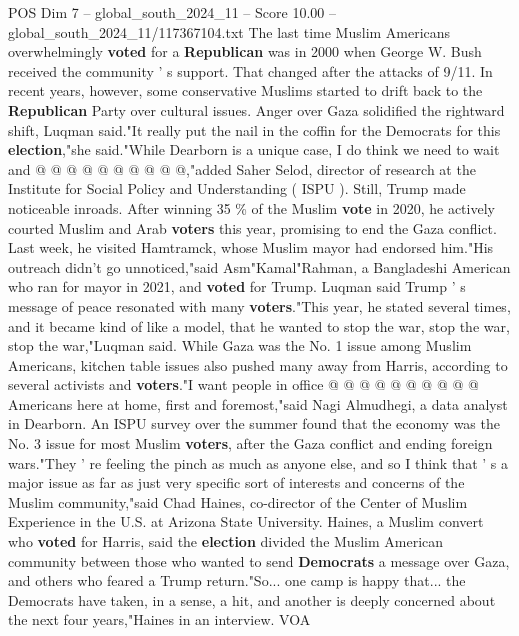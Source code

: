 \begin{textsample}{POS Dim 7 – global\_south\_2024\_11 – Score 10.00 – global\_south\_2024\_11/117367104.txt}
The last time Muslim Americans overwhelmingly \textbf{voted} for a \textbf{Republican} was in 2000 when George W.
Bush received the community ' s support.
That changed after the attacks of 9/11.
In recent years, however, some conservative Muslims started to drift back to the \textbf{Republican} Party over cultural issues.
Anger over Gaza solidified the rightward shift, Luqman said."It really put the nail in the coffin for the Democrats for this \textbf{election},"she said."While Dearborn is a unique case, I do think we need to wait and @ @ @ @ @ @ @ @ @ @,"added Saher Selod, director of research at the Institute for Social Policy and Understanding ( ISPU ).
Still, Trump made noticeable inroads.
After winning 35 \% of the Muslim \textbf{vote} in 2020, he actively courted Muslim and Arab \textbf{voters} this year, promising to end the Gaza conflict.
Last week, he visited Hamtramck, whose Muslim mayor had endorsed him."His outreach didn't go unnoticed,"said Asm"Kamal"Rahman, a Bangladeshi American who ran for mayor in 2021, and \textbf{voted} for Trump.
Luqman said Trump ' s message of peace resonated with many \textbf{voters}."This year, he stated several times, and it became kind of like a model, that he wanted to stop the war, stop the war, stop the war,"Luqman said.
While Gaza was the No. 1 issue among Muslim Americans, kitchen table issues also pushed many away from Harris, according to several activists and \textbf{voters}."I want people in office @ @ @ @ @ @ @ @ @ @ Americans here at home, first and foremost,"said Nagi Almudhegi, a data analyst in Dearborn.
An ISPU survey over the summer found that the economy was the No. 3 issue for most Muslim \textbf{voters}, after the Gaza conflict and ending foreign wars."They ' re feeling the pinch as much as anyone else, and so I think that ' s a major issue as far as just very specific sort of interests and concerns of the Muslim community,"said Chad Haines, co-director of the Center of Muslim Experience in the U.S. at Arizona State University.
Haines, a Muslim convert who \textbf{voted} for Harris, said the \textbf{election} divided the Muslim American community between those who wanted to send \textbf{Democrats} a message over Gaza, and others who feared a Trump return."So... one camp is happy that... the Democrats have taken, in a sense, a hit, and another is deeply concerned about the next four years,"Haines in an interview.
VOA

\end{textsample}
